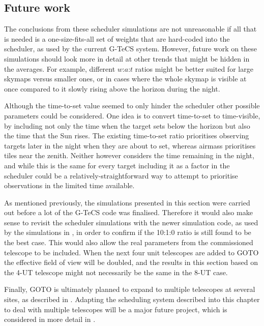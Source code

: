 \subsection{Future work}
\label{sec:scheduler_sim_future}
\begin{colsection}

The conclusions from these scheduler simulations are not unreasonable if all that is needed is a one-size-fits-all set of weights that are hard-coded into the scheduler, as used by the current G-TeCS system. However, future work on these simulations should look more in detail at other trends that might be hidden in the averages. For example, different $w$:$a$:$t$ ratios might be better suited for large skymaps versus smaller ones, or in cases where the whole skymap is visible at once compared to it slowly rising above the horizon during the night.

Although the time-to-set value seemed to only hinder the scheduler other possible parameters could be considered. One idea is to convert time-to-set to time-visible, by including not only the time when the target sets below the horizon but also the time that the Sun rises. The existing time-to-set ratio prioritises observing targets later in the night when they are about to set, whereas airmass prioritises tiles near the zenith. Neither however considers the time remaining in the night, and while this is the same for every target including it as a factor in the scheduler could be a relatively-straightforward way to attempt to prioritise observations in the limited time available.

As mentioned previously, the simulations presented in this section were carried out before a lot of the G-TeCS code was finalised. Therefore it would also make sense to revisit the scheduler simulations with the newer simulation code, as used by the simulations in , in order to confirm if the 10:1:0 ratio is still found to be the best case. This would also allow the real parameters from the commissioned telescope to be included. When the next four unit telescopes are added to GOTO the effective field of view will be doubled, and the results in this section based on the 4-UT telescope might not necessarily be the same in the 8-UT case.

Finally, GOTO is ultimately planned to expand to multiple telescopes at several sites, as described in . Adapting the scheduling system described into this chapter to deal with multiple telescopes will be a major future project, which is considered in more detail in .

\end{colsection}

